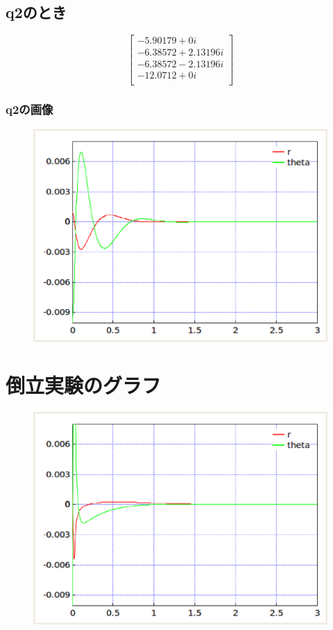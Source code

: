 \documentclass[10pt,a4paper,titlepage]{jreport} %
\begin{document}
\subsection{q2のとき}

\[
\begin{bmatrix}
-5.90179 + 0i \\
-6.38572 + 2.13196i \\
-6.38572 - 2.13196i \\
-12.0712 + 0i \\
\end{bmatrix}
\]

\subsubsection{q2の画像}

\begin{figure}[H] %
  \centering
  \includegraphics[width=0.6\linewidth]{4000Src.eps} %
\end{figure}

\section{倒立実験のグラフ}

\begin{figure}[H] %
  \centering
  \includegraphics[width=0.6\linewidth]{7700Src.eps} %
\end{figure}
\end{document}
